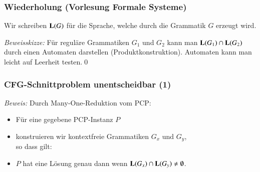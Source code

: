 \documentclass[aspectratio=1610,onlymath]{beamer}
\begin{document}
\begin{frame}\frametitle{Wiederholung (Vorlesung Formale Systeme)}

Wir schreiben $\textbf{\textcolor{black}{L}}(G)$ für die Sprache, welche durch die Grammatik $G$ erzeugt wird.\bigskip

\pause\emph{Beweisskizze:} Für reguläre Grammatiken $G_1$ und $G_2$ kann man $\textbf{\textcolor{black}{L}}(G_1)\cap\textbf{\textcolor{black}{L}}(G_2)$ durch einen Automaten darstellen (Produktkonstruktion). Automaten kann man leicht auf Leerheit testen.\qed\bigskip\pause


\end{frame}

\begin{frame}\frametitle{CFG-Schnittproblem unentscheidbar (1)}


\pause\emph{Beweis:} Durch Many-One-Reduktion vom PCP:\pause\medskip

\begin{itemize}
\item Für eine gegebene PCP-Instanz $P$
\item konstruieren wir kontextfreie Grammatiken $G_x$ und $G_y$,\\[1ex]
	so dass gilt:
\item $P$ hat eine Lösung genau dann wenn $\textbf{\textcolor{black}{L}}(G_x)\cap\textbf{\textcolor{black}{L}}(G_y)\neq\emptyset$.
\end{itemize}

\end{frame}
\end{document}
